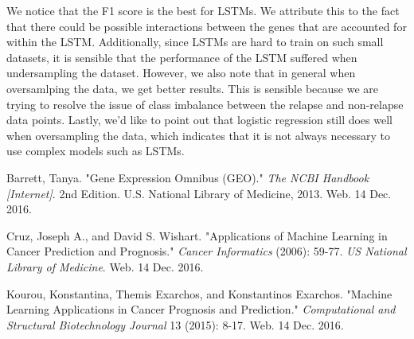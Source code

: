 \documentclass[12pt]{scrartcl}
\begin{document}
    We notice that the F1 score is the best for LSTMs. We attribute this to the fact that there could be possible interactions between the genes that are accounted for within the LSTM. Additionally, since LSTMs are hard to train on such small datasets, it is sensible that the performance of the LSTM suffered when undersampling the dataset. However, we also note that in general when oversamlping the data, we get better results. This is sensible because we are trying to resolve the issue of class imbalance between the relapse and non-relapse data points. Lastly, we'd like to point out that logistic regression still does well when oversampling the data, which indicates that it is not always necessary to use complex models such as LSTMs. 
       
    \begin{thebibliography}{9}

Barrett, Tanya. "Gene Expression Omnibus (GEO)." \textit{The NCBI Handbook [Internet]}. 2nd Edition. U.S. National Library of Medicine, 2013. Web. 14 Dec. 2016.

Cruz, Joseph A., and David S. Wishart. "Applications of Machine Learning in Cancer Prediction and Prognosis." \textit{Cancer Informatics} (2006): 59-77. \textit{US National Library of Medicine}. Web. 14 Dec. 2016.

Kourou, Konstantina, Themis Exarchos, and Konstantinos Exarchos. "Machine Learning Applications in Cancer Prognosis and Prediction." \textit{Computational and Structural Biotechnology Journal} 13 (2015): 8-17. Web. 14 Dec. 2016.

\end{thebibliography}
    
\end{document}
